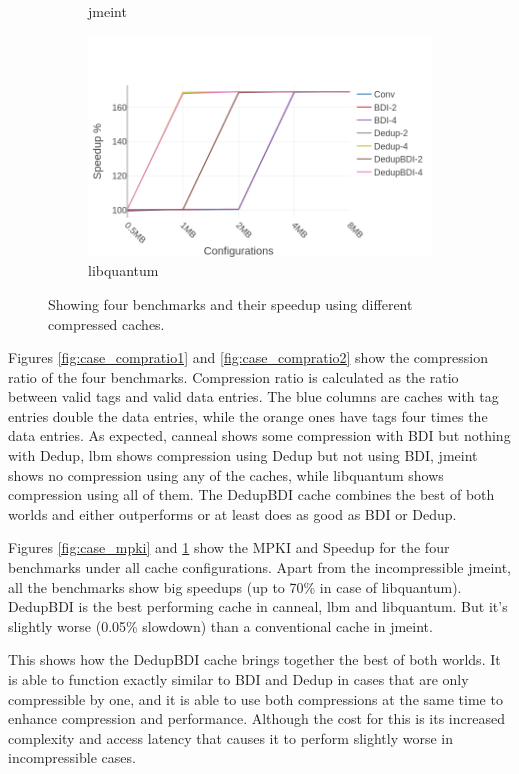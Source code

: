 \begin{figure}
\begin{subfigure}{0.5\textwidth}
        \caption{jmeint}
    \end{subfigure}
    \begin{subfigure}{0.5\textwidth}
        \includegraphics[width=\textwidth]{libquantum-speedup.png}
        \caption{libquantum}
    \end{subfigure}
    \caption[Case Study: Speedup]{Showing four benchmarks and their speedup using different compressed caches.}
    \label{fig:case_speedup}
\end{figure}
Figures \ref{fig:case_compratio1} and \ref{fig:case_compratio2} show the compression ratio of the four benchmarks. Compression ratio is calculated as the ratio between valid tags and valid data entries. The blue columns are caches with tag entries double the data entries, while the orange ones have tags four times the data entries. As expected, canneal shows some compression with BDI but nothing with Dedup, lbm shows compression using Dedup but not using BDI, jmeint shows no compression using any of the caches, while libquantum shows compression using all of them. The DedupBDI cache combines the best of both worlds and either outperforms or at least does as good as BDI or Dedup.\par
Figures \ref{fig:case_mpki} and \ref{fig:case_speedup} show the MPKI and Speedup for the four benchmarks under all cache configurations. Apart from the incompressible jmeint, all the benchmarks show big speedups (up to 70\% in case of libquantum). DedupBDI is the best performing cache in canneal, lbm and libquantum. But it's slightly worse (0.05\% slowdown) than a conventional cache in jmeint.\par
This shows how the DedupBDI cache brings together the best of both worlds. It is able to function exactly similar to BDI and Dedup in cases that are only compressible by one, and it is able to use both compressions at the same time to enhance compression and performance. Although the cost for this is its increased complexity and access latency that causes it to perform slightly worse in incompressible cases.


